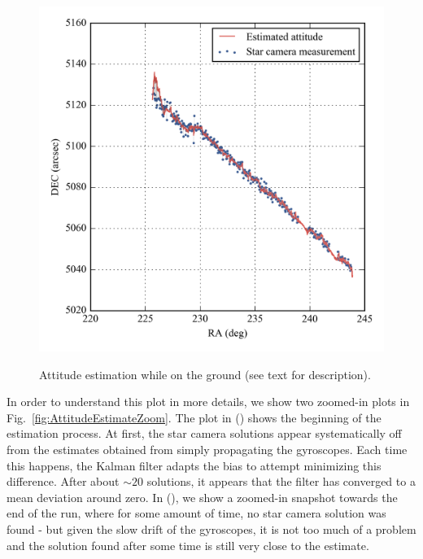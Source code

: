 \begin{figure}[!ht]
\begin{center}
\includegraphics{Figures/attitude_estimate.png}
\label{fig:GyroAttitudeEstimate}
\caption[Attitude estimation while on the ground]{Attitude estimation while on the ground (see text for description).}
\end{center}
\end{figure}

In order to understand this plot in more details, we show two zoomed-in plots in Fig.~\ref{fig:AttitudeEstimateZoom}. The plot in () shows the beginning of the estimation process. At first, the star camera solutions appear systematically off from the estimates obtained from simply propagating the gyroscopes. Each time this happens, the Kalman filter adapts the bias to attempt minimizing this difference. After about $\sim 20$ solutions, it appears that the filter has converged to a mean deviation around zero. In (), we show a zoomed-in snapshot towards the end of the run, where for some amount of time, no star camera solution was found - but given the slow drift of the gyroscopes, it is not too much of a problem and the solution found after some time is still very close to the estimate.

